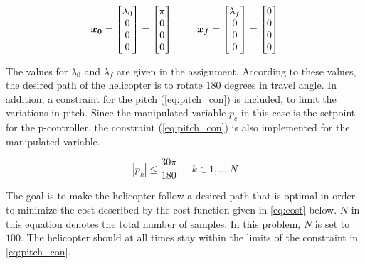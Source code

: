\documentclass[a4paper, 12pt]{article}\usepackage[utf8]{inputenc}
\begin{document}
\begin{equation}\label{eq:x0xf}
     \boldsymbol{x_0}=\begin{bmatrix}
        \lambda_0\\
        0\\
        0\\
        0\\
    \end{bmatrix}
    =\begin{bmatrix}
        \pi\\
        0\\
        0\\
        0\\
    \end{bmatrix}
    \begin{tabular}{cc}
         &  \\
         & 
    \end{tabular}
    \boldsymbol{x_f}=\begin{bmatrix}
        \lambda_{f}\\
        0\\
        0\\
        0\\
    \end{bmatrix}
    =\begin{bmatrix}
        0\\
        0\\
        0\\
        0\\
    \end{bmatrix} 
\end{equation}

 The values for $\lambda_0$ and $\lambda_f$ are given in the assignment. According to these values, the desired path of the helicopter is to rotate 180 degrees in travel angle. In addition, a constraint for the pitch (\ref{eq:pitch_con}) is included, to limit the variations in pitch. Since the manipulated variable $p_c$ in this case is the setpoint for the p-controller, the constraint (\ref{eq:pitch_con}) is also implemented for the manipulated variable.

\begin{equation}\label{eq:pitch_con}
    |p_k|\leq \frac{30 \pi}{180}, \quad k \in {1,....N}
\end{equation}

The goal is to make the helicopter follow a desired path that is optimal in order to minimize the cost described by the cost function given in \ref{eq:cost} below. $N$ in this equation denotes the total number of samples. In this problem, $N$ is set to $100$. The helicopter should at all times stay within the limits of the constraint in \ref{eq:pitch_con}. 
\end{document}
